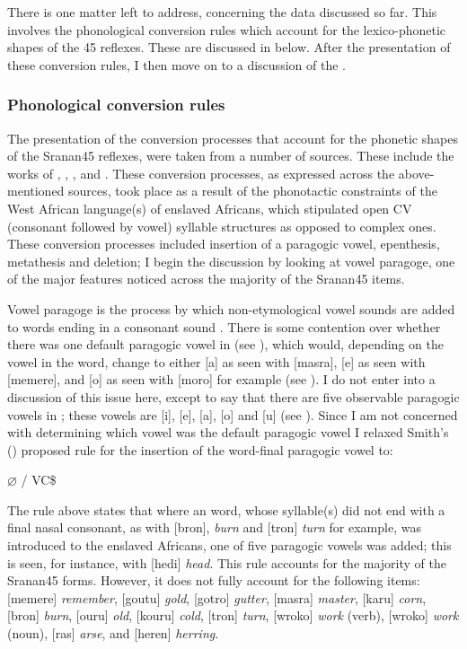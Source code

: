 {{{There is one matter left to address, concerning the data discussed so far. This involves the phonological conversion rules which account for the lexico-phonetic shapes of the 45  reflexes. These are discussed in  below. After the presentation of these conversion rules, I then move on to a discussion of the .

\subsubsection{Phonological conversion rules}\label{3.3.2.9}
The presentation of the conversion processes that account for the phonetic shapes of the Sranan45 reflexes, were taken from a number of sources. These include the works of \citet{Smith77, Smith87, Smith08}, \citet{DeCamp74}, \citet{Holm88}, and \citet{Plag00}. These conversion processes, as expressed across the above-mentioned sources, took place as a result of the phonotactic constraints of the West African language(s) of enslaved Africans, which stipulated open CV (consonant followed by vowel) syllable structures as opposed to complex ones. These conversion processes included insertion of a paragogic vowel, epenthesis, metathesis and deletion; I begin the discussion by looking at vowel paragoge, one of the major features noticed across the majority of the Sranan45 items.

Vowel paragoge is the process by which non-etymological vowel sounds are added to words ending in a consonant sound \citep{Plag00}. There is some contention over whether there was one default paragogic vowel in  (see \citealt{Smith77}), which would, depending on the vowel in the  word, change to either [a] as seen with [masra], [e] as seen with [memere], and [o] as seen with [moro] for example (see \citealt{Plag00}). I do not enter into a discussion of this issue here, except to say that there are five observable paragogic vowels in ; these vowels are [i], [e], [a], [o] and [u] (see \citealt[311]{Plag00}). Since I am not concerned with determining which vowel was the default paragogic vowel I relaxed Smith's (\citeyear{Smith77}) proposed rule for the insertion of the word-final paragogic vowel to:

\begin{center}
$\varnothing$ \textrightarrow [V(i, e, a, o, u)] / VC\$
\end{center}

The rule above states that where an  word, whose syllable(s) did not end with a final nasal consonant, as with [bron], \emph{burn} and [tron] \emph{turn} for example, was introduced to the enslaved Africans, one of five paragogic vowels was added; this is seen, for instance, with [hedi] \emph{head}. This rule accounts for the majority of the Sranan45 forms. However, it does not fully account for the following items: [memere] \emph{remember}, [goutu] \emph{gold}, [gotro] \emph{gutter}, [masra] \emph{master}, [karu] \emph{corn}, [bron] \emph{burn}, [ouru] \emph{old}, [kouru] \emph{cold}, [tron] \emph{turn}, [wroko] \emph{work} (verb), [wroko] \emph{work} (noun), [ras] \emph{arse}, and [heren] \emph{herring}.

}}}
